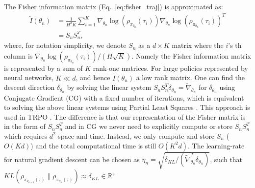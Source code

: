 \documentclass{article}
\newcommand{\wen}[1]{\textcolor{green}{\bf Wen: {#1}}}
\begin{document}
The Fisher information matrix (Eq.~\ref{eq:fisher_traj}) is approximated as:
\begin{align}
\tilde{I}(\theta_n) &= \frac{1}{H^2K}\sum_{i=1}^K \nabla_{\theta_n}\log(\rho_{\pi_{\theta_n}}(\tau_i))\nabla_{\theta_n}\log(\rho_{\pi_{\theta_n}}(\tau_i))^T \nonumber\\
& = S_n S_n^T,
\end{align} where, for notation simplicity, we denote $S_n$ as a $d\times K$ matrix where the $i$'s th column is $\nabla_{\theta_n}\log(\rho_{\pi_{\theta_n}}(\tau_i))/(H\sqrt{K})$. Namely the Fisher information matrix is represented by a sum of $K$ rank-one matrices. For large policies represented by neural networks, $K\ll d$, and hence  $\tilde{I}(\theta_n)$ a low rank matrix. %
One can find the descent direction $\delta_{\theta_n}$ by solving the linear system $S_nS_n^T \delta_{\theta_n} = \tilde{\nabla}_{\theta_n}$ for $\delta_{\theta_n}$ using Conjugate Gradient (CG) with a fixed number of iterations, which is equivalent to solving the above linear systems using  Partial Least Squares \cite{phatak2002exploiting}. This approach is used in TRPO \cite{schulman2015trust}. The difference is that our representation of the Fisher matrix is in the form of $S_nS_n^T$ and in CG we never need to explicitly compute or store $S_nS_n^T$ which requires $d^2$ space and time. Instead, we only compute and store $S_n$ ($O(Kd)$) and the total computational time is still $O(K^2 d)$. The learning-rate for natural gradient descent can be chosen as $\eta_n = \sqrt{\delta_{KL}/(\tilde{\nabla}_{\theta_n}^T\delta_{\theta_n})}$, such that $KL(\rho_{\pi_{\theta_{n+1}}(\tau)}\|\rho_{\pi_{\theta_{n}}(\tau)})\approx \delta_{KL}\in\mathbb{R}^+$
\end{document}
